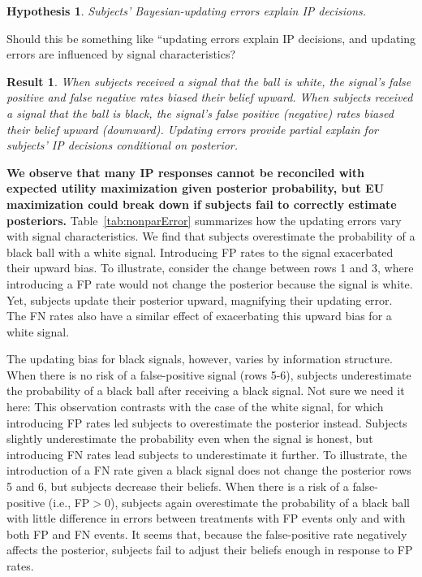 \documentclass[12pt,a4paper]{article}
\newcommand{\aut}[1]{{\color{Red}#1}}
\newcommand{\pmt}[1]{{\color{Blue}#1}}
\newtheorem{hypothesis}{Hypothesis}
\newtheorem{result}{Result}
\begin{document}


\begin{hypothesis} Subjects' Bayesian-updating errors explain IP decisions. \end{hypothesis}
\pmt{Should this be something like ``updating errors explain IP decisions, and updating errors are influenced by signal characteristics?}
\begin{result} When subjects received a signal that the ball is white, the signal's false positive and false negative rates biased their belief upward. When subjects received a signal that the ball is black, the signal's false positive (negative) rates biased their belief upward (downward). Updating errors provide partial explain for subjects' IP decisions conditional on posterior.\end{result}

\textbf{We observe that many IP responses cannot be reconciled with expected utility maximization given posterior probability, but EU maximization could break down if subjects fail to correctly estimate posteriors.} Table~\ref{tab:nonparError} summarizes how the updating errors vary with signal characteristics. We find that subjects overestimate the probability of a black ball with a white signal. Introducing FP rates to the signal exacerbated their upward bias. To illustrate, consider the change between rows 1 and 3, where introducing a FP rate would not change the posterior because the signal is white. Yet, subjects update their posterior upward, magnifying their updating error. The FN rates also have a similar effect of exacerbating this upward bias for a white signal.

The updating bias for black signals, however, varies by information structure. When there is no risk of a false-positive signal (rows 5-6), subjects underestimate the probability of a black ball after receiving a black signal. \aut{Not sure we need it here: This observation contrasts with the case of the white signal, for which introducing FP rates led subjects to overestimate the posterior instead.} Subjects slightly underestimate the probability even when the signal is honest, but introducing FN rates lead subjects to underestimate it further. To illustrate, the introduction of a FN rate given a black signal does not change the posterior rows 5 and 6, but subjects decrease their beliefs. When there is a risk of a false-positive (i.e., FP$>$0), subjects again overestimate the probability of a black ball with little difference in errors between treatments with FP events only and with both FP and FN events. It seems that, because the false-positive rate negatively affects the posterior, subjects fail to adjust their beliefs enough in response to FP rates.
\end{document}
